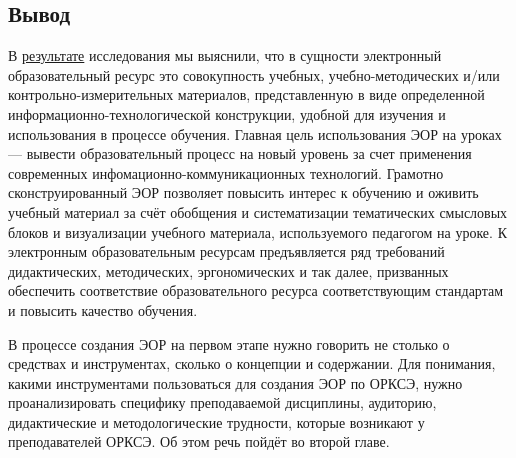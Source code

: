 \newpage
\subsection{Вывод}
В \hyperref[task1]{результате} исследования мы выяснили, что в сущности электронный образовательный ресурс это совокупность учебных, учебно-методических и/или контрольно-измерительных материалов, представленную в виде определенной информационно-технологической конструкции, удобной для изучения и
использования в процессе обучения\cite{jurkina20}. Главная цель использования ЭОР на уроках --- вывести образовательный процесс на новый уровень за счет применения современных инфомационно-коммуникационных технологий. Грамотно сконструированный ЭОР позволяет повысить интерес к обучению и оживить учебный материал за счёт обобщения и систематизации тематических смысловых блоков и визуализации учебного материала, используемого педагогом на уроке.
К электронным образовательным ресурсам предъявляется ряд требований дидактических, методических, эргономических и так далее, призванных обеспечить соответствие образовательного ресурса соответствующим стандартам и повысить качество обучения.

В процессе создания ЭОР на первом этапе нужно говорить не столько о средствах и инструментах, сколько о концепции и содержании. Для понимания, какими инструментами пользоваться для создания ЭОР по ОРКСЭ, нужно проанализировать специфику преподаваемой дисциплины, аудиторию, дидактические и методологические трудности, которые возникают у преподавателей ОРКСЭ. Об этом речь пойдёт во второй главе.